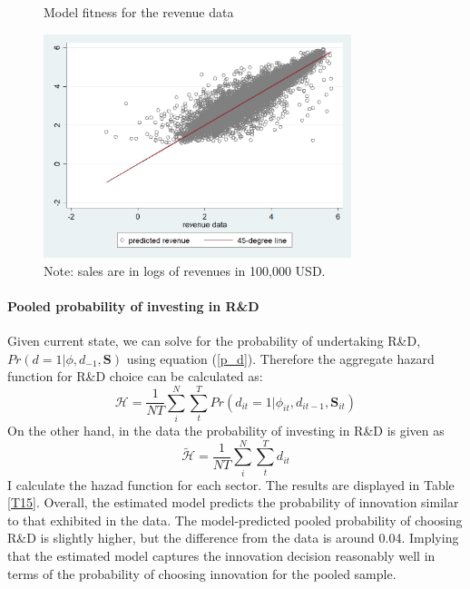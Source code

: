 \documentclass[English]{article}
\begin{document}
\begin{center}
\begin{figure}[H]
\caption{Model fitness for the revenue data}
\label{F3}
\begin{centering}
\includegraphics[width=0.8\textwidth]{revenue.png}
\par\end{centering}
\caption*{\small{}Note: sales are in logs of revenues in 100,000 USD.}{\small \par}
\end{figure}
\par\end{center}

\paragraph{Pooled probability of investing in R\&D}
Given current state, we can solve for the probability of undertaking R\&D,$Pr(d=1|\phi,d_{-1},\mathbf{S})$ using equation (\ref{p_d}). Therefore the aggregate hazard function for R\&D choice can be calculated as:
\begin{equation}\label{hazad}
\mathcal{H}=\frac{1}{NT}\sum_{i}^{N}\sum_{t}^{T} Pr(d_{it}=1|\phi_{it},d_{it-1},\mathbf{S}_{it})
\end{equation}
On the other hand, in the data the probability of investing in R\&D is given as
\begin{equation}
\tilde {\mathcal{H}}=\frac{1}{NT}\sum_{i}^{N}\sum_{t}^{T} d_{it}
\end{equation}
I calculate the hazad function for each sector. The results are displayed in Table \ref{T15}. Overall, the estimated model predicts the probability of innovation similar to that exhibited in the data. The model-predicted pooled probability of choosing R\&D is slightly higher, but the difference from the data is around 0.04. Implying that the estimated model captures the innovation decision reasonably well in terms of the probability of choosing innovation for the pooled sample. 
\end{document}
